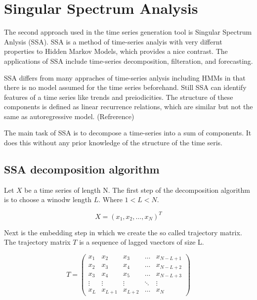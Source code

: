 
\chapter{Singular Spectrum Analysis}\label{chapter:ssa}

The second approach used in the time series generation tool is Singular Spectrum Anlysis (SSA). SSA is a method of time-series analyis with very differnt properties to Hidden Markov Models, which provides a nice contrast. The applications of SSA include time-series decomposition, filteration, and forecasting. 

SSA differs from many appraches of time-series anlysis including HMMs in that there is no model assumed for the time series beforehand. Still SSA can identify features of a time series like trends and preiodicities. The structure of these components is defined as linear recurrence relations, which are similar but not the same as autoregressive model. (Refrerence)

The main task of SSA is to decompose a time-series into a sum of components. It does this without any prior knowledge of the structure of the time seris. 

\section{SSA decomposition algorithm}

Let $X$ be a time series of length N. The first step of the decomposition algorithm is to choose a winodw length $L$. Where $1 < L < N$. 

\begin{equation}
   X = (x_1, x_2, \ldots ,x_N)^T
\end{equation}

Next is the embedding step in which we create the so called trajectory matrix. The trajectory matrix $T$ is a sequence of lagged vaectors of size L. 

\begin{equation}
   T = 
\left(\begin{array}{ccccc}
x_{1} & x_{2} & x_{3} & \dots & x_{N-L+1} \\
x_{2} & x_{3} & x_{4} & \dots & x_{N-L+2} \\
x_{3} & x_{4} & x_{5} & \dots & x_{N-L+3} \\
\vdots & \vdots & \vdots & \ddots & \vdots \\
x_{L} & x_{L+1} & x_{L+2} & \dots & x_{N}
\end{array}\right)
   \label{eq:ssa-trajectory}
\end{equation}

